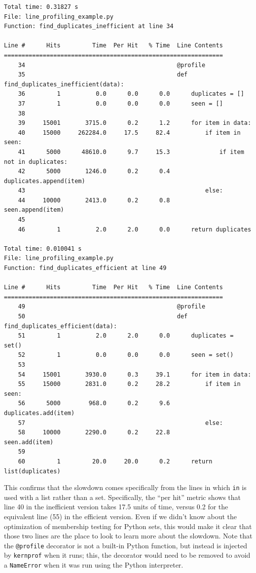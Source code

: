 \begin{lstlisting}[style=shell]
Total time: 0.31827 s
File: line_profiling_example.py
Function: find_duplicates_inefficient at line 34

Line #      Hits         Time  Per Hit   % Time  Line Contents
==============================================================
    34                                           @profile
    35                                           def find_duplicates_inefficient(data):
    36         1          0.0      0.0      0.0      duplicates = []
    37         1          0.0      0.0      0.0      seen = []
    38                                               
    39     15001       3715.0      0.2      1.2      for item in data:
    40     15000     262284.0     17.5     82.4          if item in seen: 
    41      5000      48610.0      9.7     15.3              if item not in duplicates:  
    42      5000       1246.0      0.2      0.4                  duplicates.append(item)
    43                                                   else:
    44     10000       2413.0      0.2      0.8              seen.append(item)
    45                                               
    46         1          2.0      2.0      0.0      return duplicates

Total time: 0.010041 s
File: line_profiling_example.py
Function: find_duplicates_efficient at line 49

Line #      Hits         Time  Per Hit   % Time  Line Contents
==============================================================
    49                                           @profile
    50                                           def find_duplicates_efficient(data):
    51         1          2.0      2.0      0.0      duplicates = set()
    52         1          0.0      0.0      0.0      seen = set()
    53                                               
    54     15001       3930.0      0.3     39.1      for item in data:
    55     15000       2831.0      0.2     28.2          if item in seen:
    56      5000        968.0      0.2      9.6              duplicates.add(item)
    57                                                   else:
    58     10000       2290.0      0.2     22.8              seen.add(item)
    59                                               
    60         1         20.0     20.0      0.2      return list(duplicates)
\end{lstlisting}

This confirms that the slowdown comes specifically from the lines in which \texttt{in} is used with a list rather than a set. Specifically, the ``per hit'' metric shows that line 40 in the inefficient version takes 17.5 units of time, versus 0.2 for the equivalent line (55) in the efficient version.  Even if we didn't know about the optimization of membership testing for Python sets, this would make it clear that those two lines are the place to look to learn more about the slowdown.  Note that the \texttt{@profile} decorator is not a built-in Python function, but instead is injected by \texttt{kernprof} when it runs; this, the decorator would need to be removed to avoid a \texttt{NameError} when it was run using the Python interpreter.

